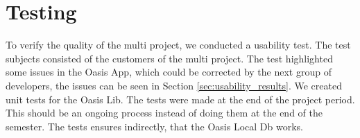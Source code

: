 \section{Testing}
To verify the quality of the multi project, we conducted a usability test.
The test subjects consisted of the customers of the multi project.
The test highlighted some issues in the Oasis App, which could be corrected by the next group of developers, the issues can be seen in Section \vref{sec:usability_results}.
We created unit tests for the Oasis Lib.
The tests were made at the end of the project period.
This should be an ongoing process instead of doing them at the end of the semester.
The tests ensures indirectly, that the Oasis Local Db works.